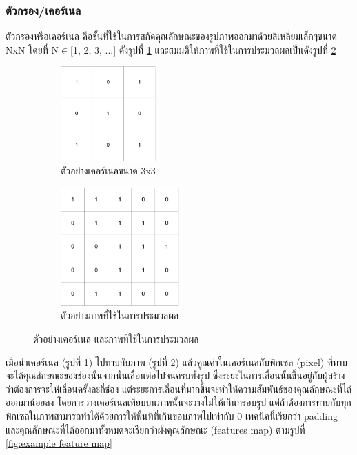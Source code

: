 \subsubsection{ตัวกรอง/เคอร์เนล}
ตัวกรองหรือเคอร์เนล คือชั้นที่ใช้ในการสกัดคุณลักษณะของรูปภาพออกมาด้วยสี่เหลี่ยมเล็กๆขนาด NxN โดยที่ N$\in$[1, 2, 3, ...] ดังรูปที่ \ref{fig:kernel_3x3} 
และสมมติให้ภาพที่ใช้ในการประมวลผลเป็นดังรูปที่ \ref{fig:input_ex}
\begin{figure}[!ht]
	\centering
	\begin{subfigure}[b]{0.5\textwidth}
        \centering
        \includegraphics[width=0.4\textwidth]{chapter2/images/kernel_ex.png}
		\caption{ตัวอย่างเคอร์เนลขนาด 3x3}
		\label{fig:kernel_3x3}
    \end{subfigure}
    \begin{subfigure}[b]{0.5\textwidth}
        \centering
		\includegraphics[width=0.5\textwidth]{chapter2/images/input_ex.png}
		\caption{ตัวอย่างภาพที่ใช้ในการประมวลผล}
        \label{fig:input_ex}
	\end{subfigure}
	\caption{ตัวอย่างเคอร์เนล และภาพที่ใช้ในการประมวลผล}
	\label{fig:kernel_input_ex}
\end{figure}
\clearpage
เมื่อนำเคอร์เนล (รูปที่ \ref{fig:kernel_3x3}) ไปทาบกับภาพ (รูปที่ \ref{fig:input_ex}) แล้วคูณค่าในเคอร์เนลกับพิกเซล (pixel) ที่ทาบจะได้คุณลักษณะของช่องนั้นจากนั้นเลื่อนต่อไปจนครบทั้งรูป 
ซึ่งระยะในการเลื่อนนั้นขึ้นอยู่กับผู้สร้างว่าต้องการจะให้เลื่อนครั้งละกี่ช่อง แต่ระยะการเลื่อนที่มากขึ้นจะทำให้ความสัมพันธ์ของคุณลักษณะที่ได้ออกมาน้อยลง โดยการวางเคอร์เนลเทียบบนภาพนั้นจะวางไม่ให้เกินกรอบรูป 
แต่ถ้าต้องการทาบกับทุกพิกเซลในภาพสามารถทำได้ด้วยการให้พื้นที่ที่เกินขอบภาพไปเท่ากับ 0 เทคนิคนี้เรียกว่า padding และคุณลักษณะที่ได้ออกมาทั้งหมดจะเรียกว่าผังคุณลักษณะ (features map) ตามรูปที่ \ref{fig:example feature map}

